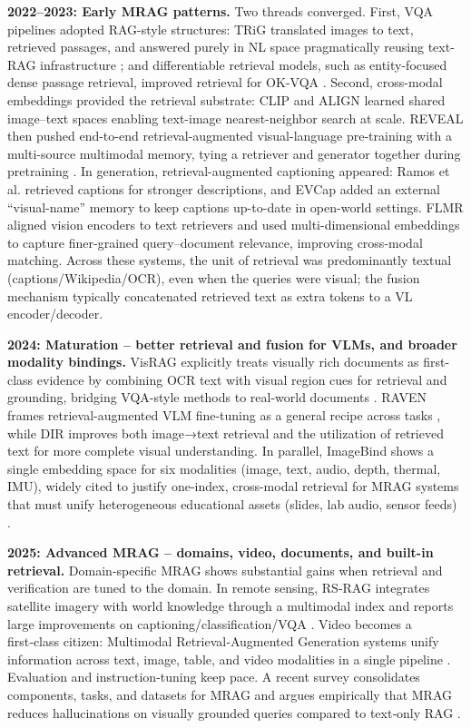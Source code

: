 \textbf{2022–2023: Early MRAG patterns.}  
Two threads converged. First, VQA pipelines adopted RAG-style structures: TRiG translated images to text, retrieved passages, and answered purely in NL space pragmatically reusing text-RAG infrastructure \cite{gao2022trig}; and differentiable retrieval models, such as entity-focused dense passage retrieval, improved retrieval for OK-VQA \cite{wu2022entityvqa}. Second, cross-modal embeddings provided the retrieval substrate: CLIP and ALIGN learned shared image–text spaces enabling text-image nearest-neighbor search at scale. REVEAL then pushed end-to-end retrieval-augmented visual-language pre-training with a multi-source multimodal memory, tying a retriever and generator together during pretraining \cite{hu2023reveal}. In generation, retrieval-augmented captioning appeared: Ramos et al. retrieved captions for stronger descriptions, and EVCap added an external “visual-name” memory to keep captions up-to-date in open-world settings. FLMR aligned vision encoders to text retrievers and used multi-dimensional embeddings to capture finer-grained query–document relevance, improving cross-modal matching. Across these systems, the unit of retrieval was predominantly textual (captions/Wikipedia/OCR), even when the queries were visual; the fusion mechanism typically concatenated retrieved text as extra tokens to a VL encoder/decoder.

\textbf{2024: Maturation – better retrieval and fusion for VLMs, and broader modality bindings.}  
VisRAG explicitly treats visually rich documents as first-class evidence by combining OCR text with visual region cues for retrieval and grounding, bridging VQA-style methods to real-world documents \cite{yu2024visrag}. RAVEN frames retrieval-augmented VLM fine-tuning as a general recipe across tasks \cite{rao2024raven}, while DIR improves both image→text retrieval and the utilization of retrieved text for more complete visual understanding. In parallel, ImageBind shows a single embedding space for six modalities (image, text, audio, depth, thermal, IMU), widely cited to justify one-index, cross-modal retrieval for MRAG systems that must unify heterogeneous educational assets (slides, lab audio, sensor feeds) \cite{girdhar2023imagebind}.

\textbf{2025: Advanced MRAG – domains, video, documents, and built-in retrieval.}  
Domain‑specific MRAG shows substantial gains when retrieval and verification are tuned to the domain. In remote sensing, RS‑RAG integrates satellite imagery with world knowledge through a multimodal index and reports large improvements on captioning/classification/VQA \cite{wen2025rsrag}. Video becomes a first‑class citizen: Multimodal Retrieval‑Augmented Generation systems unify information across text, image, table, and video modalities in a single pipeline \cite{drushchak2025unified}. Evaluation and instruction‑tuning keep pace. A recent survey consolidates components, tasks, and datasets for MRAG and argues empirically that MRAG reduces hallucinations on visually grounded queries compared to text‑only RAG \cite{mei2025survey}.



